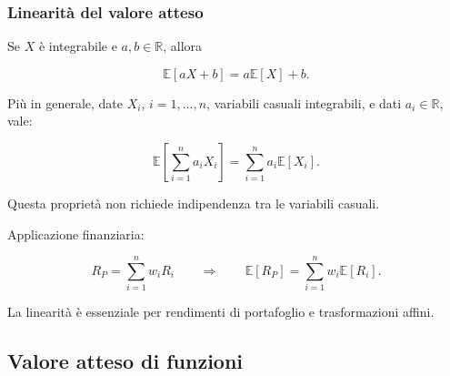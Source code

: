\documentclass[handout]{beamer}%
\providecommand{\R}{\mathbb{R}}
\providecommand{\E}{\mathbb{E}}
\providecommand{\1}{\mathbf{1}}
\providecommand{\QTR}[2]{\csname #1\endcsname{#2}}
\begin{document}
\begin{frame}%
%

\frametitle{Linearit\`{a} del valore atteso}%


Se $X$ \`{e} integrabile e $a,b\in\mathbb{R}$, allora%

\[
\E[aX+b] = a\E[X]+b.
\]


\medskip

Pi\`{u} in generale, date $X_{i}$, $i=1,\ldots,n$, variabili casuali
integrabili, e dati $a_{i}\in\R$, vale:%

\[
\E\left[ \sum_{i=1}^{n} a_{i}X_{i}\right]  = \sum_{i=1}^{n} a_{i}\E[X_i].
\]


\medskip

Questa propriet\`{a} non richiede indipendenza tra le variabili casuali.

\medskip

Applicazione finanziaria:%

\[
R_{P}=\sum_{i=1}^{n} w_{i} R_{i} \qquad\Longrightarrow\qquad\E[R_P]=\sum
_{i=1}^{n} w_{i}\E[R_i].
\]


\medskip

La linearit\`{a} \`{e} essenziale per rendimenti di portafoglio e
trasformazioni affini.%

\transboxout
\end{frame}%




\subsection{Valore atteso di funzioni}%
\end{document}
